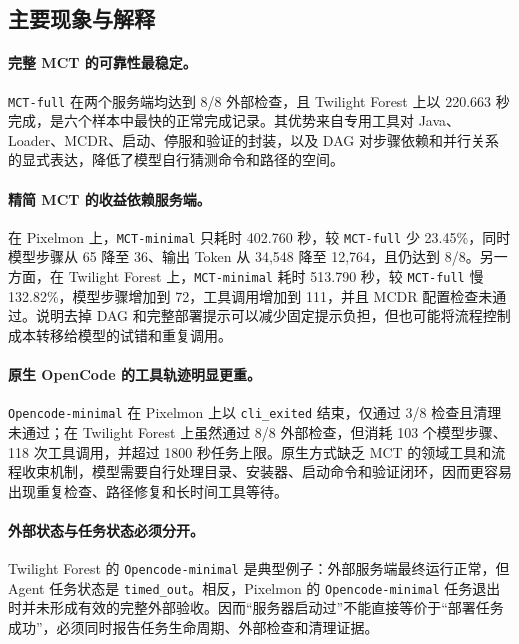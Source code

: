 \documentclass[UTF8,a4paper,11pt]{ctexart}
\newcommand{\mctfull}{\texttt{MCT-full}}
\newcommand{\mctminimal}{\texttt{MCT-minimal}}
\newcommand{\ocminimal}{\texttt{Opencode-minimal}}
\begin{document}
\subsection{主要现象与解释}
\paragraph{完整 MCT 的可靠性最稳定。}
\mctfull{} 在两个服务端均达到 8/8 外部检查，且 Twilight Forest 上以 220.663 秒完成，是六个样本中最快的正常完成记录。其优势来自专用工具对 Java、Loader、MCDR、启动、停服和验证的封装，以及 DAG 对步骤依赖和并行关系的显式表达，降低了模型自行猜测命令和路径的空间。

\paragraph{精简 MCT 的收益依赖服务端。}
在 Pixelmon 上，\mctminimal{} 只耗时 402.760 秒，较 \mctfull{} 少 23.45\%，同时模型步骤从 65 降至 36、输出 Token 从 34,548 降至 12,764，且仍达到 8/8。另一方面，在 Twilight Forest 上，\mctminimal{} 耗时 513.790 秒，较 \mctfull{} 慢 132.82\%，模型步骤增加到 72，工具调用增加到 111，并且 MCDR 配置检查未通过。说明去掉 DAG 和完整部署提示可以减少固定提示负担，但也可能将流程控制成本转移给模型的试错和重复调用。

\paragraph{原生 OpenCode 的工具轨迹明显更重。}
\ocminimal{} 在 Pixelmon 上以 \texttt{cli\_exited} 结束，仅通过 3/8 检查且清理未通过；在 Twilight Forest 上虽然通过 8/8 外部检查，但消耗 103 个模型步骤、118 次工具调用，并超过 1800 秒任务上限。原生方式缺乏 MCT 的领域工具和流程收束机制，模型需要自行处理目录、安装器、启动命令和验证闭环，因而更容易出现重复检查、路径修复和长时间工具等待。

\paragraph{外部状态与任务状态必须分开。}
Twilight Forest 的 \ocminimal{} 是典型例子：外部服务端最终运行正常，但 Agent 任务状态是 \texttt{timed\_out}。相反，Pixelmon 的 \ocminimal{} 任务退出时并未形成有效的完整外部验收。因而“服务器启动过”不能直接等价于“部署任务成功”，必须同时报告任务生命周期、外部检查和清理证据。
\end{document}

